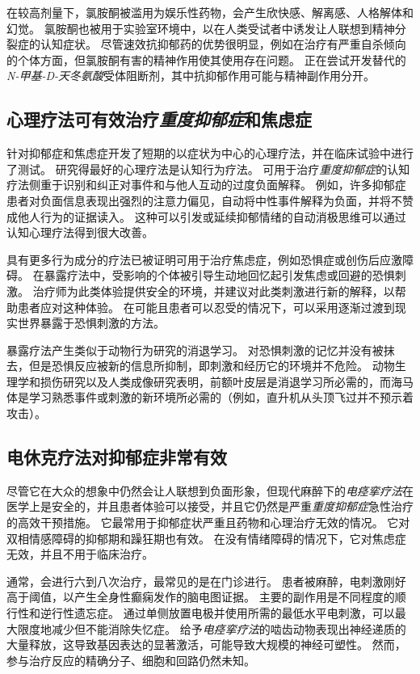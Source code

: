 在较高剂量下，氯胺酮被滥用为娱乐性药物，会产生欣快感、解离感、人格解体和幻觉。
氯胺酮也被用于实验室环境中，以在人类受试者中诱发让人联想到精神分裂症的认知症状。
尽管速效抗抑郁药的优势很明显，例如在治疗有严重自杀倾向的个体方面，但氯胺酮有害的精神作用使其使用存在问题。
正在尝试开发替代的\textit{N-甲基-D-天冬氨酸}受体阻断剂，其中抗抑郁作用可能与精神副作用分开。



\subsection{心理疗法可有效治疗\textit{重度抑郁症}和焦虑症}

针对抑郁症和焦虑症开发了短期的以症状为中心的心理疗法，并在临床试验中进行了测试。
研究得最好的心理疗法是认知行为疗法。
可用于治疗\textit{重度抑郁症}的认知疗法侧重于识别和纠正对事件和与他人互动的过度负面解释。
例如，许多抑郁症患者对负面信息表现出强烈的注意力偏见，自动将中性事件解释为负面，并将不赞成他人行为的证据读入。
这种可以引发或延续抑郁情绪的自动消极思维可以通过认知心理疗法得到很大改善。


具有更多行为成分的疗法已被证明可用于治疗焦虑症，例如恐惧症或创伤后应激障碍。
在暴露疗法中，受影响的个体被引导生动地回忆起引发焦虑或回避的恐惧刺激。
治疗师为此类体验提供安全的环境，并建议对此类刺激进行新的解释，以帮助患者应对这种体验。
在可能且患者可以忍受的情况下，可以采用逐渐过渡到现实世界暴露于恐惧刺激的方法。


暴露疗法产生类似于动物行为研究的消退学习。
对恐惧刺激的记忆并没有被抹去，但是恐惧反应被新的信息所抑制，即刺激和经历它的环境并不危险。
动物生理学和损伤研究以及人类成像研究表明，前额叶皮层是消退学习所必需的，而海马体是学习熟悉事件或刺激的新环境所必需的（例如，直升机从头顶飞过并不预示着攻击）。



\subsection{电休克疗法对抑郁症非常有效}

尽管它在大众的想象中仍然会让人联想到负面形象，但现代麻醉下的\textit{电痉挛疗法}在医学上是安全的，并且患者体验可以接受，并且它仍然是严重\textit{重度抑郁症}急性治疗的高效干预措施。
它最常用于抑郁症状严重且药物和心理治疗无效的情况。
它对双相情感障碍的抑郁期和躁狂期也有效。
在没有情绪障碍的情况下，它对焦虑症无效，并且不用于临床治疗。


通常，会进行六到八次治疗，最常见的是在门诊进行。
患者被麻醉，电刺激刚好高于阈值，以产生全身性癫痫发作的脑电图证据。
主要的副作用是不同程度的顺行性和逆行性遗忘症。
通过单侧放置电极并使用所需的最低水平电刺激，可以最大限度地减少但不能消除失忆症。
给予\textit{电痉挛疗法}的啮齿动物表现出神经递质的大量释放，这导致基因表达的显著激活，可能导致大规模的神经可塑性。
然而，参与治疗反应的精确分子、细胞和回路仍然未知。



